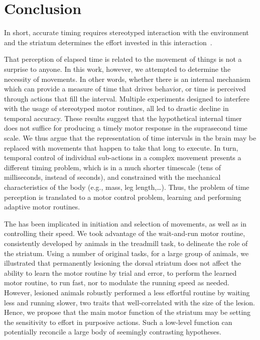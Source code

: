 \section{Conclusion} \label{ch:discussion:conclusion}

In short, accurate timing requires stereotyped interaction with the environment and the striatum determines the effort invested in this interaction~\cite{Safaie2020PNAS,JuradoParras2020}.
\par
That perception of elapsed time is related to the movement of things is not a surprise to anyone.
In this work, however, we attempted to determine the necessity of movements.
In other words, whether there is an internal mechanism which can provide a measure of time that drives behavior, or time is perceived through actions that fill the interval.
Multiple experiments designed to interfere with the usage of stereotyped motor routines, all led to drastic decline in temporal accuracy.
These results suggest that the hypothetical internal timer does not suffice for producing a timely motor response in the suprasecond time scale.
We thus argue that the representation of time intervals in the brain may be replaced with movements that happen to take that long to execute.
In turn, temporal control of individual sub-actions in a complex movement presents a different timing problem, which is in a much shorter timescale (tens of milliseconds, instead of seconds), and constrained with the mechanical characteristics of the body (e.g., mass, leg length,\dots).
Thus, the problem of time perception is translated to a motor control problem, learning and performing adaptive motor routines.
\par
The  has been implicated in initiation and selection of movements, as well as in controlling their speed.
We took advantage of the wait-and-run motor routine, consistently developed by animals in the treadmill task, to delineate the role of the striatum.
Using a number of original tasks, for a large group of animals, we illustrated that permanently lesioning the dorsal striatum does not affect the ability to learn the motor routine by trial and error, to perform the learned motor routine, to run fast, nor to modulate the running speed as needed.
However, lesioned animals robustly performed a less effortful routine by waiting less and running slower, two traits that well-correlated with the size of the lesion.
Hence, we propose that the main motor function of the striatum may be setting the sensitivity to effort in purposive actions.
Such a low-level function can potentially reconcile a large body of seemingly contrasting hypotheses.